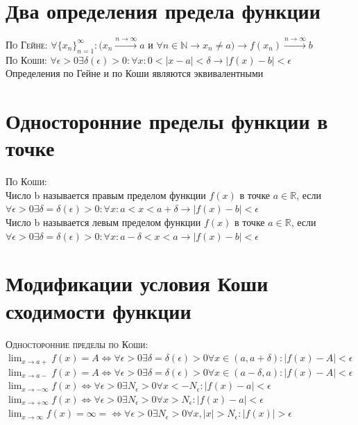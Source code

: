 \documentclass[14pt]{article}
\begin{document}
    \section{Два определения предела функции}
        \textsc{По Гейне:} $\forall \{x_n\}^{\infty}_{n=1} : (x_n \xrightarrow{n \rightarrow \infty} a $ и $ \forall n \in \mathbb{N} \rightarrow x_n \ne a) \rightarrow f(x_n) \xrightarrow{n \rightarrow \infty} b$ \\ 
        \textsc{По Коши:} $\forall \epsilon > 0 \exists \delta(\epsilon) > 0: \forall x : 0 < |x-a| < \delta \rightarrow |f(x) -b| < \epsilon$ \\   
        Определения по Гейне и по Коши являются эквивалентными 

    \section{Односторонние пределы функции в точке}
        \textsc{По Коши:} \\
        Число b называется правым пределом функции $f(x)$ в точке $a \in \mathbb{R} $, если $\forall \epsilon > 0 \exists \delta = \delta(\epsilon) > 0 : \forall x : a < x < a + \delta \rightarrow |f(x) -b| < \epsilon$ \\ 
        Число b называется левым пределом функции $f(x)$ в точке $a \in \mathbb{R} $, если $\forall \epsilon > 0 \exists \delta = \delta(\epsilon) > 0 : \forall x : a - \delta  < x < a \rightarrow |f(x) -b| < \epsilon$

    \section{Модификации условия Коши сходимости функции}
        \textsc{Односторонние пределы по Коши:} \\
            $\lim_{x \rightarrow a + } f(x) = A \Leftrightarrow \forall \epsilon > 0 \exists \delta = \delta(\epsilon) > 0 \forall x \in (a, a+\delta) :|f(x) - A | < \epsilon$ \\ 
            $\lim_{x \rightarrow a - } f(x) = A \Leftrightarrow \forall \epsilon > 0 \exists \delta = \delta(\epsilon) > 0 \forall x \in (a-\delta,a) :|f(x) - A | < \epsilon$ \\ 
            $\lim_{x \rightarrow -\infty} f(x) \Leftrightarrow \forall \epsilon > 0 \exists N_\epsilon > 0 \forall x < -N_\epsilon : | f(x) - a | < \epsilon$ \\
            $\lim_{x \rightarrow +\infty} f(x)  \Leftrightarrow \forall \epsilon > 0 \exists N_\epsilon > 0 \forall x > N_\epsilon : | f(x) - a | < \epsilon$ \\
            $\lim_{x \rightarrow \infty} f(x) = \infty =\Leftrightarrow \forall \epsilon > 0 \exists N_\epsilon > 0 \forall x, |x| > N_\epsilon : |f(x)| > \epsilon$
\end{document}
